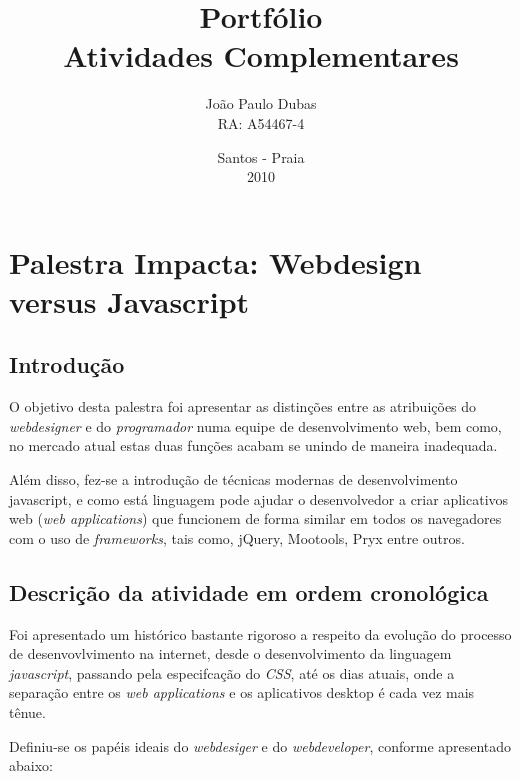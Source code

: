 \documentclass[a4paper,12pt]{report}
\begin{document}
    \title{Portf\'{o}lio\\Atividades Complementares}
    \author{Jo\~{a}o Paulo Dubas\\RA: A54467-4}
    \date{Santos - Praia\\2010}

    \maketitle

    \tableofcontents

    \chapter[Webdesign versus Javascript]{Palestra Impacta: Webdesign versus
    Javascript}

        \section{Introdu\c{c}\~{a}o}
        O objetivo desta palestra foi apresentar as distin\c{c}\~{o}es entre as
        atribui\c{c}\~{o}es do \emph{webdesigner} e do \emph{programador} numa
        equipe de desenvolvimento web, bem como, no mercado atual estas
        duas fun\c{c}\~{o}es acabam se unindo de maneira inadequada.

        Al\'{e}m disso, fez-se a introdu\c{c}\~{a}o de t\'{e}cnicas modernas de
        desenvolvimento javascript, e como est\'{a} linguagem pode ajudar
        o desenvolvedor a criar aplicativos web (\emph{web applications})
        que funcionem de forma similar em todos os navegadores com o
        uso de \emph{frameworks}, tais como, jQuery, Mootools, Pryx
        entre outros.

        \section[Descri\c{c}\~{a}o atividade]{Descri\c{c}\~{a}o da atividade em
        ordem cronol\'{o}gica}
        Foi apresentado um hist\'{o}rico bastante rigoroso a respeito da
        evolu\c{c}\~{a}o do processo de desenvovlvimento na internet, desde o
        desenvolvimento da linguagem \emph{javascript}, passando pela
        especifca\c{c}\~{a}o do \emph{CSS}, at\'{e} os dias atuais, onde a
        separa\c{c}\~{a}o entre os \emph{web applications} e os aplicativos
        desktop \'{e} cada vez mais t\^{e}nue.

        Definiu-se os pap\'{e}is ideais do \emph{webdesiger} e do
        \emph{webdeveloper}, conforme apresentado abaixo:
\end{document}
